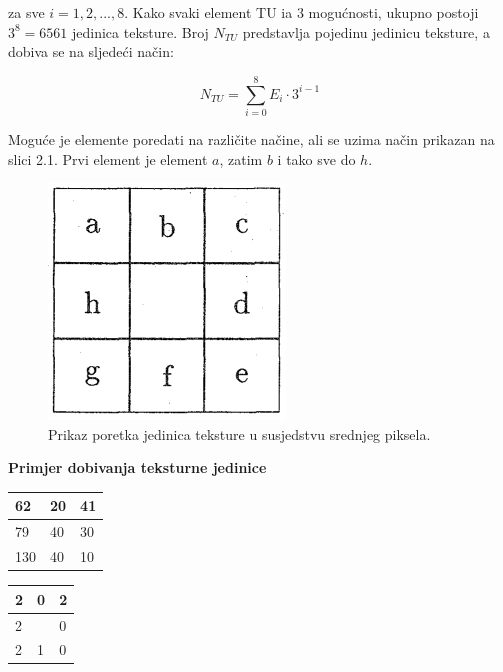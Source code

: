 \documentclass[times, utf8, zavrsni]{fer}
\begin{document}
za sve \(i=1,2,...,8\). Kako svaki element TU ia 3 mogućnosti, ukupno
postoji \(3^8 = 6561\) jedinica teksture. Broj \(N_{TU}\) predstavlja 
pojedinu jedinicu teksture, a dobiva se na sljedeći način:

\[
N_{TU} = \sum_{i=0}^{8} E_i \cdot 3^{i-1}
\]

\newpage

Moguće je elemente poredati na različite načine, ali se uzima 
način prikazan na slici 2.1. Prvi element je element \(a\), zatim \(b\) i 
tako sve do \(h\).  

\begin{figure}[htbp]
\centering
\includegraphics[scale=0.5]{img/jKxBPc.png}
\caption{Prikaz poretka jedinica teksture u susjedstvu srednjeg piksela.}
\end{figure}

\textbf{Primjer dobivanja teksturne jedinice}

\begin{multicols}{2}

\begin{minipage}{\linewidth}
\centering
\begin{tabularx}{0.4\textwidth}{| X | X | X |}
\hline
62 & 20 & 41 \\ 
\hline
79 & 40 & 30 \\ 
\hline
130 & 40 & 10 \\
\hline
\end{tabularx}
\end{minipage}

\begin{minipage}{\linewidth}
\centering
\begin{tabularx}{0.4\textwidth}{| X | X | X |}
\hline
2 & 0 & 2 \\ 
\hline
2 &  & 0 \\ 
\hline
2 & 1 & 0 \\
\hline
\end{tabularx}
\end{minipage}

\end{multicols}
\end{document}

